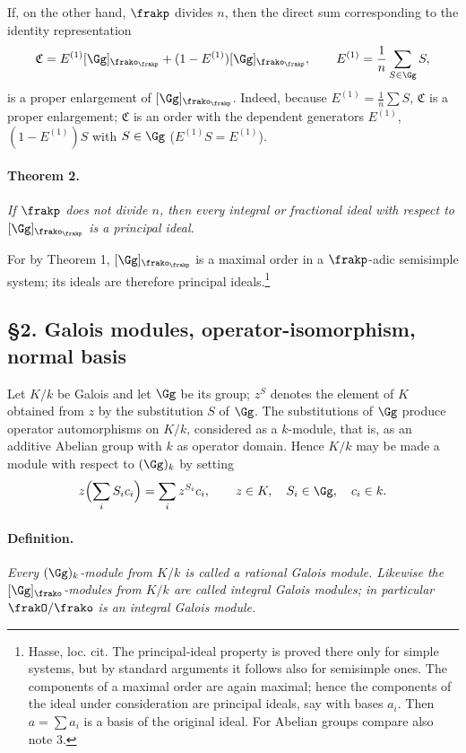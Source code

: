 If, on the other hand, \(\frakp\) divides \(n\), then the direct sum corresponding to the identity representation
\[
        \mathfrak C=E^{(1)}[\Gg]_{\frako_\frakp}+(1-E^{(1)})[\Gg]_{\frako_\frakp},
        \qquad
        E^{(1)}=\frac1n\sum_{S\in\Gg} S,
\]
is a proper enlargement of \([\Gg]_{\frako_\frakp}\). Indeed, because \(E^{(1)}=\frac1n\sum S\), \(\mathfrak C\) is a proper enlargement; \(\mathfrak C\) is an order with the dependent generators \(E^{(1)}\), \((1-E^{(1)})S\) with \(S\in\Gg\) (\(E^{(1)}S=E^{(1)}\)).

\paragraph{Theorem 2.}
\emph{If \(\frakp\) does not divide \(n\), then every integral or fractional ideal with respect to \([\Gg]_{\frako_\frakp}\) is a principal ideal.}

For by Theorem 1, \([\Gg]_{\frako_\frakp}\) is a maximal order in a \(\frakp\)-adic semisimple system; its ideals are therefore principal ideals.\footnote{Hasse, loc. cit. The principal-ideal property is proved there only for simple systems, but by standard arguments it follows also for semisimple ones. The components of a maximal order are again maximal; hence the components of the ideal under consideration are principal ideals, say with bases \(a_i\). Then \(a=\sum a_i\) is a basis of the original ideal. For Abelian groups compare also note 3.}

\subsection*{§2. Galois modules, operator-isomorphism, normal basis}

Let \(K/k\) be Galois and let \(\Gg\) be its group; \(z^S\) denotes the element of \(K\) obtained from \(z\) by the substitution \(S\) of \(\Gg\). The substitutions of \(\Gg\) produce operator automorphisms on \(K/k\), considered as a \(k\)-module, that is, as an additive Abelian group with \(k\) as operator domain. Hence \(K/k\) may be made a module with respect to \((\Gg)_k\) by setting
\[
        z\Bigl(\sum_i S_i c_i\Bigr)=\sum_i z^{S_i}c_i,
        \qquad z\in K,
        \quad S_i\in\Gg,
        \quad c_i\in k.
\]

\paragraph{Definition.}
\emph{Every \((\Gg)_k\)-module from \(K/k\) is called a rational Galois module. Likewise the \([\Gg]_\frako\)-modules from \(K/k\) are called integral Galois modules; in particular \(\frakO/\frako\) is an integral Galois module.}

